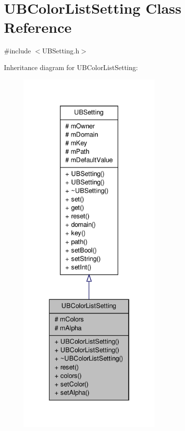 \hypertarget{class_u_b_color_list_setting}{\section{U\-B\-Color\-List\-Setting Class Reference}
\label{da/df0/class_u_b_color_list_setting}
}


{\ttfamily \#include $<$U\-B\-Setting.\-h$>$}



Inheritance diagram for U\-B\-Color\-List\-Setting\-:
\nopagebreak
\begin{figure}[H]
\begin{center}
\leavevmode
\includegraphics[width=202pt]{d9/df1/class_u_b_color_list_setting__inherit__graph}
\end{center}
\end{figure}


